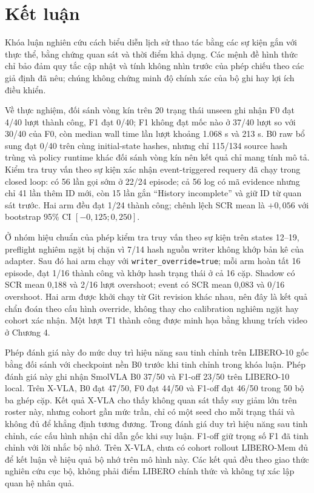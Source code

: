 \chapter{Kết luận}

Khóa luận nghiên cứu cách biểu diễn lịch sử thao tác bằng các sự kiện gắn với thực thể, bằng chứng quan sát và thời điểm khả dụng. Các mệnh đề hình thức chỉ bảo đảm quy tắc cập nhật và tính không nhìn trước của phép chiếu theo các giả định đã nêu; chúng không chứng minh độ chính xác của bộ ghi hay lợi ích điều khiển.

Về thực nghiệm, đối sánh vòng kín trên 20 trạng thái unseen ghi nhận F0 đạt 4/40 lượt thành công, F1 đạt 0/40; F1 không đạt mốc nào ở 37/40 lượt so với 30/40 của F0, còn median wall time lần lượt khoảng 1.068 s và 213 s. B0 raw bổ sung đạt 0/40 trên cùng initial-state hashes, nhưng chỉ 115/134 source hash trùng và policy runtime khác đối sánh vòng kín nên kết quả chỉ mang tính mô tả. Kiểm tra truy vấn theo sự kiện xác nhận event-triggered requery đã chạy trong closed loop: có 56 lần gọi sớm ở 22/24 episode; cả 56 log có mã evidence nhưng chỉ 41 lần thêm ID mới, còn 15 lần gắn ``History incomplete'' và giữ ID từ quan sát trước. Hai arm đều đạt 1/24 thành công; chênh lệch SCR mean là $+0{,}056$ với bootstrap 95\% CI $[-0{,}125; 0{,}250]$.

Ở nhóm hiệu chuẩn của phép kiểm tra truy vấn theo sự kiện trên states 12--19, preflight nghiêm ngặt bị chặn vì 7/14 hash nguồn writer không khớp bản kê của adapter. Sau đó hai arm chạy với \texttt{writer\_override=true}; mỗi arm hoàn tất 16 episode, đạt 1/16 thành công và khớp hash trạng thái ở cả 16 cặp. Shadow có SCR mean 0,188 và 2/16 lượt overshoot; event có SCR mean 0,083 và 0/16 overshoot. Hai arm được khởi chạy từ Git revision khác nhau, nên đây là kết quả chẩn đoán theo cấu hình override, không thay cho calibration nghiêm ngặt hay cohort xác nhận. Một lượt T1 thành công được minh họa bằng khung trích video ở Chương 4.

Phép đánh giá này đo mức duy trì hiệu năng sau tinh chỉnh trên LIBERO-10 gốc bằng đối sánh với checkpoint nền B0 trước khi tinh chỉnh trong khóa luận. Phép đánh giá này ghi nhận SmolVLA B0 37/50 và F1-off 23/50 trên LIBERO-10 local. Trên X-VLA, B0 đạt 47/50, F0 đạt 44/50 và F1-off đạt 46/50 trong 50 bộ ba ghép cặp. Kết quả X-VLA cho thấy không quan sát thấy suy giảm lớn trên roster này, nhưng cohort gần mức trần, chỉ có một seed cho mỗi trạng thái và không đủ để khẳng định tương đương. Trong đánh giá duy trì hiệu năng sau tinh chỉnh, các cấu hình nhận chỉ dẫn gốc khi suy luận. F1-off giữ trọng số F1 đã tinh chỉnh với lời nhắc bộ nhớ. Trên X-VLA, chưa có cohort rollout LIBERO-Mem đủ để kết luận về hiệu quả bộ nhớ trên mô hình này. Các kết quả đều theo giao thức nghiên cứu cục bộ, không phải điểm LIBERO chính thức và không tự xác lập quan hệ nhân quả.

